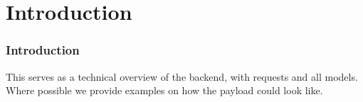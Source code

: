 \part{Introduction}
\section{Introduction}
This serves as a technical overview of the backend, with requests and all models. Where possible we provide examples on how the payload could look like.